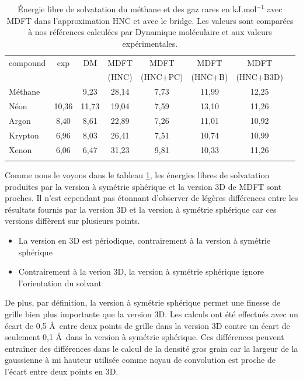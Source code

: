 \begin{table}[ht]
  \centering
  \begin{tabular}{l c c c c c c c}
    \hline & \\[-1em]\hline
    compound   & exp  & DM & MDFT & MDFT & MDFT  & MDFT \\
               &      &    & (HNC)  & (HNC+PC)  & (HNC+B) & (HNC+B3D) \\
    \hline
    Méthane    &       &  9,23 & 28,14 & 7,73 & 11,99 & 12,25 \\
    Néon       & 10,36 & 11,73 & 19,04 & 7,59 & 13,10 & 11,26 \\
    Argon      &  8,40 &  8,61 & 22,89 & 7,26 & 11,01 & 10,92 \\
    Krypton    &  6,96 &  8,03 & 26,41 & 7,51 & 10,74 & 10,99 \\
    Xenon      &  6,06 &  6,47 & 31,23 & 9,81 & 10,33 & 11,26 \\
    \hline & \\[-1em]\hline
  \end{tabular}
  \caption[\'Energie libre de solvatation du méthane et des gaz rares.]{\'Energie libre de solvatation du méthane et des gaz rares en $\mathrm{kJ}.\mathrm{mol}^{-1}$ avec MDFT dans l'approximation HNC et avec le bridge. Les valeurs sont comparées à nos références calculées par Dynamique moléculaire et aux valeurs expérimentales\cite{straatsma_free_1986}.}
  \label{tab:deltag_1D_3D}  
\end{table}

Comme nous le voyons dans le tableau \ref{tab:deltag_1D_3D}, les énergies libres de solvatation produites par la version à symétrie sphérique et la version 3D de MDFT sont proches. Il n'est cependant pas étonnant d'observer de légères différences entre les résultats fournis par la version 3D et la version à symétrie sphérique car ces versions diffèrent sur plusieurs points. 

\begin{itemize}
\item La version en 3D est périodique, contrairement à la version à symétrie sphérique
\item Contrairement à la verion 3D, la version à symétrie sphérique ignore l'orientation du solvant
\end{itemize}

De plus, par définition, la version à symétrie sphérique permet une finesse de grille bien plus importante que la version 3D. Les calculs ont été effectués avec un écart de 0,5 \AA\ entre deux points de grille dans la version 3D contre un écart de seulement 0,1 \AA\ dans la version à symétrie sphérique. Ces différences peuvent entraîner des différences dans le calcul de la densité gros grain car la largeur de la gaussienne à mi hauteur utilisée comme noyau de convolution est proche de l'écart entre deux points en 3D.

